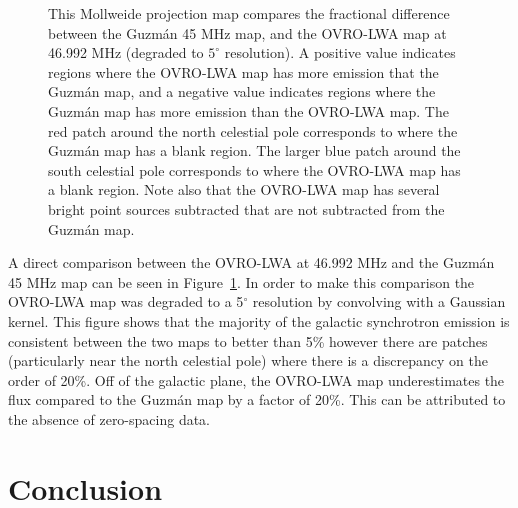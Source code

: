 \documentclass[twocolumn]{aastex61}
\newcommand{\todo}[1]{\textcolor{red}{TODO: #1}\PackageWarning{TODO:}{#1!}}
\begin{document}
\begin{figure}[t]
    \caption{
        This Mollweide projection map compares the fractional difference between the Guzm\'{a}n 45
        MHz map, and the OVRO-LWA map at 46.992 MHz (degraded to $5^\circ$ resolution). A positive
        value indicates regions where the OVRO-LWA map has more emission that the Guzm\'{a}n map,
        and a negative value indicates regions where the Guzm\'{a}n map has more emission than the
        OVRO-LWA map. The red patch around the north celestial pole corresponds to where the
        Guzm\'{a}n map has a blank region.  The larger blue patch around the south celestial pole
        corresponds to where the OVRO-LWA map has a blank region. Note also that the OVRO-LWA map
        has several bright point sources subtracted that are not subtracted from the Guzm\'{a}n map.
    }
    \label{fig:guzman-comparison}
\end{figure}

A direct comparison between the OVRO-LWA at 46.992 MHz and the Guzm\'{a}n 45 MHz map
\citep{2011A&A...525A.138G} can be seen in Figure~\ref{fig:guzman-comparison}. In order to make this
comparison the OVRO-LWA map was degraded to a 5$^\circ$ resolution by convolving with a Gaussian
kernel.  This figure shows that the majority of the galactic synchrotron emission is consistent
between the two maps to better than 5\% however there are patches (particularly near the north
celestial pole) where there is a discrepancy on the order of 20\%.  Off of the galactic plane, the
OVRO-LWA map underestimates the flux compared to the Guzm\'{a}n map by a factor of 20\%. This can be
attributed to the absence of zero-spacing data.


\section{Conclusion}




\end{document}
